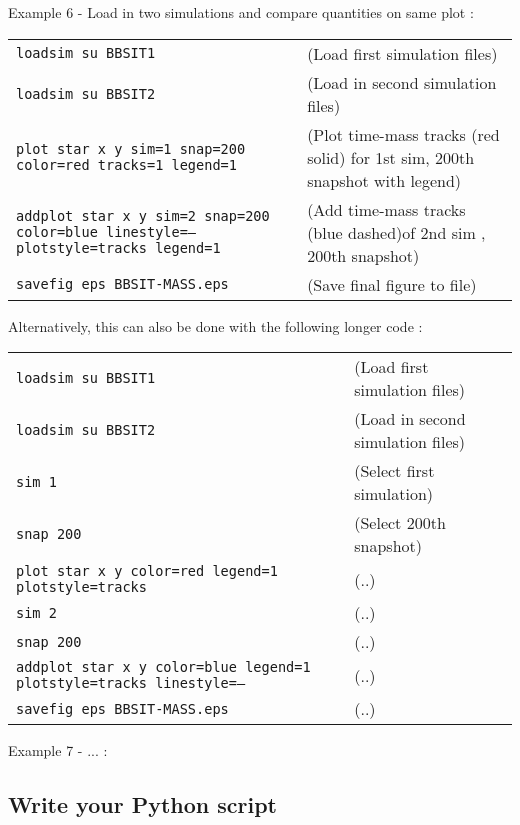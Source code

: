 \documentclass[a4paper]{article}
\newcommand{\var}[1]{\texttt{#1}}
\begin{document}
\noindent Example 6 - Load in two simulations and compare quantities on same plot : \\

\begin{tabular}{p{7cm}p{6cm}}
\var{loadsim su BBSIT1} &              (Load first simulation files) \\
\var{loadsim su BBSIT2} &              (Load in second simulation files) \\
\var{plot star x y sim=1 snap=200 color=red tracks=1 legend=1} & (Plot time-mass tracks (red solid) for 1st sim, 200th snapshot with legend) \\
\var{addplot star x y sim=2 snap=200 color=blue linestyle=-- plotstyle=tracks legend=1} & (Add time-mass tracks (blue dashed)of 2nd sim , 200th snapshot) \\
\var{savefig eps BBSIT-MASS.eps} & (Save final figure to file)
\end{tabular}
\newline

\noindent Alternatively, this can also be done with the following longer code : \\

\begin{tabular}{p{7cm}p{6cm}}
\var{loadsim su BBSIT1} &              (Load first simulation files) \\
\var{loadsim su BBSIT2} &              (Load in second simulation files) \\
\var{sim 1} &                          (Select first simulation) \\
\var{snap 200} &                       (Select 200th snapshot) \\
\var{plot star x y color=red legend=1 plotstyle=tracks} & (..) \\
\var{sim 2} &                          (..) \\
\var{snap 200} &                       (..) \\
\var{addplot star x y color=blue legend=1 plotstyle=tracks linestyle=--} & (..) \\
\var{savefig eps BBSIT-MASS.eps} &     (..) \\
\end{tabular}
\newline


\noindent Example 7 - ... :

\subsection{Write your Python script}
\end{document}
